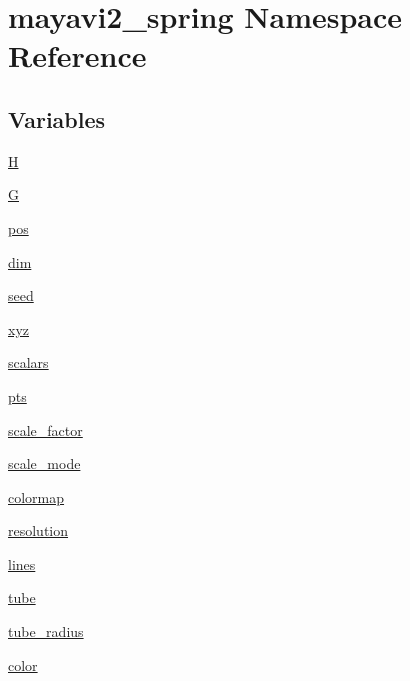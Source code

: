 \hypertarget{namespacemayavi2__spring}{}\section{mayavi2\+\_\+spring Namespace Reference}
\label{namespacemayavi2__spring}
\subsection*{Variables}
\begin{DoxyCompactItemize}
\item 
\hyperlink{namespacemayavi2__spring_a23628222b0429f28a4fdfd72b3ae0f08}{H}
\item 
\hyperlink{namespacemayavi2__spring_a51de1d6d50b2c4d0794a75ce4fafe4b0}{G}
\item 
\hyperlink{namespacemayavi2__spring_abfecd113e6fa47bb672220ea4100c638}{pos}
\item 
\hyperlink{namespacemayavi2__spring_ac80919b6486dade84efa7ffc2360bdd4}{dim}
\item 
\hyperlink{namespacemayavi2__spring_ad744d48f833d00fdc09e5a48f8723285}{seed}
\item 
\hyperlink{namespacemayavi2__spring_aaa5995b60850089c604f4fd05ac955a8}{xyz}
\item 
\hyperlink{namespacemayavi2__spring_a68958617d0a3e8795d9701c62ba7ad4c}{scalars}
\item 
\hyperlink{namespacemayavi2__spring_ad5b9833f9ff3430e8fb0185ebc70679d}{pts}
\item 
\hyperlink{namespacemayavi2__spring_abd1f12411614ada293faa8c559e84441}{scale\+\_\+factor}
\item 
\hyperlink{namespacemayavi2__spring_a2f83b76148d362b403416796f592df90}{scale\+\_\+mode}
\item 
\hyperlink{namespacemayavi2__spring_a67e8ff4344fe33ca42cac56aac243f51}{colormap}
\item 
\hyperlink{namespacemayavi2__spring_ad7274679382a23584309526cee809fac}{resolution}
\item 
\hyperlink{namespacemayavi2__spring_a5d1e216a9057cf9d9a7b5adb424648b2}{lines}
\item 
\hyperlink{namespacemayavi2__spring_a6a4604672520c1d5e00890800958ae6e}{tube}
\item 
\hyperlink{namespacemayavi2__spring_aadfeaffef90fc082f0334cde7ead26ce}{tube\+\_\+radius}
\item 
\hyperlink{namespacemayavi2__spring_a2bf55eb929f57ad25dbc7219d959f6db}{color}
\end{DoxyCompactItemize}


